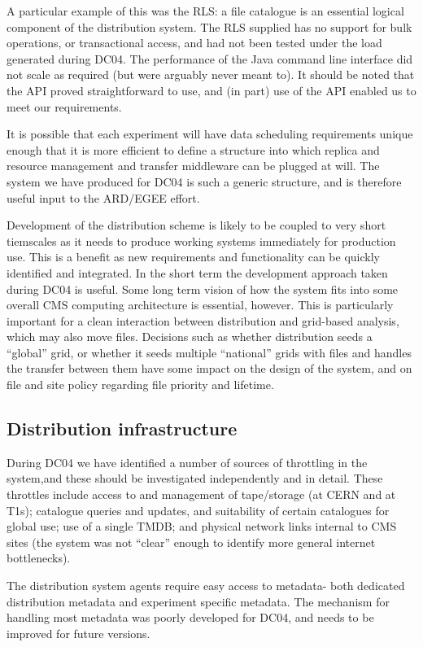 \documentclass{cmspaper}
\begin{document}
A particular example of this was the RLS: a file catalogue is an essential logical 
component of the distribution system. The RLS supplied has no support for bulk operations,
or transactional access, and had not been tested under the load generated during DC04.
The performance of the Java command line interface did not scale as required (but were
arguably never meant to). It should be noted that the API proved straightforward to use,
and (in part) use of the API enabled us to meet our requirements.

It is possible that each experiment will have data scheduling requirements unique enough
that it is more efficient to define a structure into which replica and resource management
and transfer middleware can be plugged at will. The system we have produced for DC04 is
such a generic structure, and is therefore useful input to the ARD/EGEE effort.

Development of the distribution scheme is likely to be coupled to very short tiemscales
as it needs to produce working systems immediately for production use. This is a benefit
as new requirements and functionality can be quickly identified and integrated. In the
short term the development approach taken during DC04 is useful. Some long term vision
of how the system fits into some overall CMS computing architecture is essential,
however. This is particularly important for a clean interaction between distribution and
grid-based analysis, which may also move files. Decisions such as whether distribution
seeds a ``global'' grid, or whether it seeds multiple ``national'' grids with files and 
handles the transfer between them have some impact on the design of the system, and on 
file and site policy regarding file priority and lifetime. 

\subsection{Distribution infrastructure}
During DC04 we have identified a number of sources of throttling in the system,and these
should be investigated independently and in detail. These throttles include access to and
management of tape/storage (at CERN and at T1s); catalogue queries and updates, and 
suitability of certain catalogues for global use; use of a single TMDB; and physical 
network links internal to CMS sites (the system was not ``clear'' enough to identify more
general internet bottlenecks).

The distribution system agents require easy access to metadata- both dedicated 
distribution metadata and experiment specific metadata. The mechanism for handling most
metadata was poorly developed for DC04, and needs to be improved for future versions.
\end{document}
